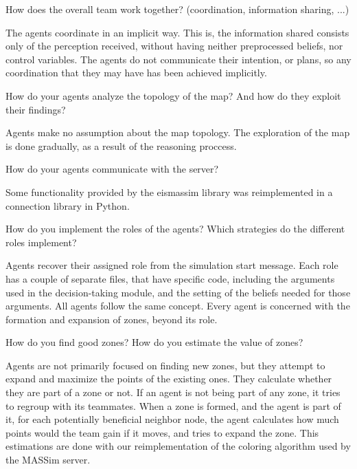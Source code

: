 \begin{question}
How does the overall team work together? (coordination, information sharing,
...) 
\end{question}

The agents coordinate in an implicit way. This is, the  information shared
consists only of the perception received, without having neither preprocessed
beliefs, nor control variables. The agents do not communicate their intention,
or plans, so any coordination that they may have has been achieved implicitly.

\begin{question}
How do your agents analyze the topology of the map? And how do they exploit
their findings? 
\end{question}

Agents make no assumption about the map topology. The exploration of the map is
done gradually, as a result of the reasoning proccess.

\begin{question}
How do your agents communicate with the server?  
\end{question}

Some functionality provided by the eismassim library was reimplemented in
a connection library in Python.

\begin{question}
How do you implement the roles of the agents? Which strategies do the different
roles implement?  
\end{question}

Agents recover their assigned role from the simulation start message.  Each role
has a couple of separate files, that have specific code, including the arguments
used in the decision-taking module, and the setting of the beliefs needed for
those arguments.  All agents follow the same concept. Every agent is concerned
with the formation and expansion of zones, beyond its role.

\begin{question}
How do you find good zones? How do you estimate the value of zones?  
\end{question}

Agents are not primarily focused on finding new zones, but they attempt to
expand and maximize the points of the existing ones. They calculate whether they
are part of a zone or not.  If an agent is not being part of any zone, it tries
to regroup with its teammates. When a zone is formed, and the agent is part of
it, for each potentially beneficial neighbor node, the agent calculates how much
points would the team gain if it moves, and tries to expand the zone.  This
estimations are done with our reimplementation of the coloring algorithm used by
the MASSim server.

